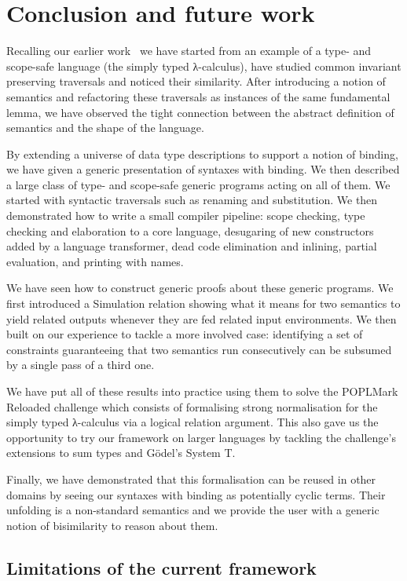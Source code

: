 \section{Conclusion and future work}

Recalling our earlier work~\citeyear{allais2017type}
we have started from an example of a type- and scope-safe language (the simply typed
λ-calculus), have studied common invariant preserving traversals and noticed their
similarity. After introducing a notion of semantics and refactoring these traversals as
instances of the same fundamental lemma, we have observed the tight
connection between the abstract definition of semantics and the shape of the
language.

By extending a universe of data type descriptions to support a notion of binding,
we have given a generic presentation of syntaxes with binding. We then described
a large class of type- and scope-safe generic programs acting on all of them.
We started with syntactic traversals such as renaming and substitution. We then
demonstrated how to write a small compiler pipeline: scope checking, type checking
and elaboration to a core language, desugaring of new constructors added by a language
transformer, dead code elimination and inlining, partial evaluation, and printing
with names.

We have seen how to construct generic proofs about these generic programs. We
first introduced a Simulation relation showing what it means for two semantics
to yield related outputs whenever they are fed related input environments. We
then built on our experience to tackle a more involved case: identifying a set
of constraints guaranteeing that two semantics run consecutively can be subsumed
by a single pass of a third one.

We have put all of these results into practice using them to solve the
POPLMark Reloaded challenge
\citeyear{POPLMarkReloaded2019}
which consists of formalising strong
normalisation for the simply typed λ-calculus via a logical relation
argument. This also gave us the opportunity to try our framework on larger
languages by tackling the challenge's extensions to sum types and G\"{o}del's
System T.

Finally, we have demonstrated that this formalisation can be reused
in other domains by seeing our syntaxes with binding as potentially cyclic
terms. Their unfolding is a non-standard semantics and we provide the
user with a generic notion of bisimilarity to reason about them.

\subsection{Limitations of the current framework}

